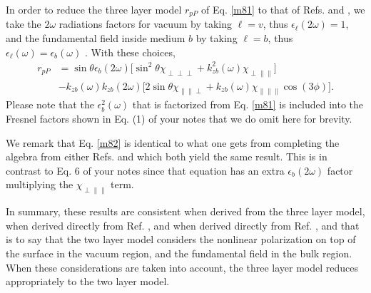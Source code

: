 \documentclass{article}
\begin{document}
\begin{enumerate}
In order to reduce the three layer model $r_{pP}$ of Eq. \eqref{m81} to that of
Refs. \cite{mizrahiJOSA88} and \cite{sipePRB87},  we take the $2\omega$
radiations factors for vacuum by taking $\ell=v$, thus
$\epsilon_{\ell}(2\omega)=1$,
and the fundamental field inside medium $b$ by taking $\ell=b$, thus
$\epsilon_{\ell}(\omega)=\epsilon_{b}(\omega)$
. With these choices,
\begin{equation}\label{m82}
\begin{split}
r_{pP}
&= \sin\theta\epsilon_{b}(2\omega)
\Big[
\sin^2\theta\chi_{\perp\perp\perp} + k^{2}_{zb}(\omega)
\chi_{\perp\parallel\parallel}
\Big]\\
&- k_{zb}(\omega)k_{zb}(2\omega)
\Big[
2\sin\theta\chi_{\parallel\parallel\perp} + k_{zb}(\omega)
\chi_{\parallel\parallel\parallel}\cos(3\phi) 
\Big].
\end{split}
\end{equation}
Please note that the $\epsilon^{2}_{b}(\omega)$ that is factorized from Eq.
\eqref{m81} is included into the Fresnel factors shown in Eq. (1) of your notes
that we do omit here for brevity.

We remark that Eq. \eqref{m82} is identical to what one gets from completing the
algebra from either Refs. \cite{sipePRB87} and \cite{mizrahiJOSA88} which both
yield the same result. This is in contrast to Eq. 6 of your notes since that
equation has an extra $\epsilon_{b}(2\omega)$ factor multiplying the
$\chi_{\perp\parallel\parallel}$ term.

In summary, these results are consistent when derived from the three layer
model, when derived directly from Ref. \cite{mizrahiJOSA88}, and when derived
directly from Ref. \cite{sipePRB87}, and that is to say that the two layer model
considers the nonlinear polarization on top of the surface in the vacuum region,
and the fundamental field in the bulk region. When these considerations are
taken into account, the three layer model reduces appropriately to the two layer
model.


\end{enumerate}
\end{document}
